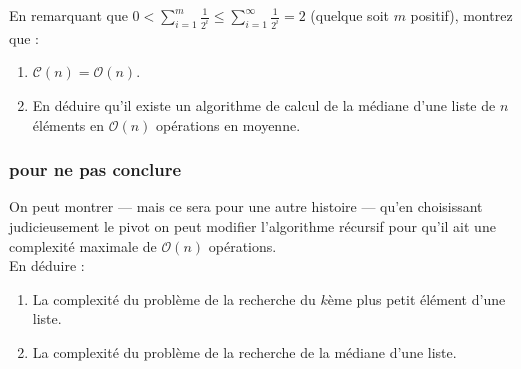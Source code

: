 \documentclass
[12pt]
{article}
\begin{document}
En remarquant que $0 < \sum_{i=1}^m\frac{1}{2^i} \leq \sum_{i=1}^\infty\frac{1}{2^i} = 2$ (quelque soit $m$ positif), montrez que :

\begin{enumerate}
  \item $\mathcal{C}(n) = \mathcal{O}(n)$.
  \item En déduire qu'il existe un algorithme de calcul de la médiane d'une liste de $n$ éléments en $\mathcal{O}(n)$ opérations en moyenne.
\end{enumerate}

\subsubsection{pour ne pas conclure}

On peut montrer — mais ce sera pour une autre histoire — qu'en choisissant judicieusement le pivot on peut modifier l'algorithme récursif pour qu'il ait une complexité maximale de $\mathcal{O}(n)$ opérations.\\
En déduire :

\begin{enumerate}
  \item La complexité du problème de la recherche du $k$ème plus petit élément d'une liste.
  \item La complexité du problème de la recherche de la médiane d'une liste.
\end{enumerate}

 
\end{document}
